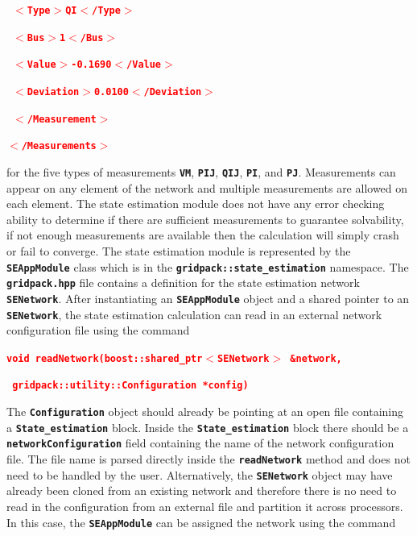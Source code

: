 \documentclass[12pt]{report} %
\begin{document}
\textcolor{red}{\texttt{\textbf{    $\boldsymbol{\mathrm{<}}$Type$\boldsymbol{\mathrm{>}}$QI$\boldsymbol{\mathrm{<}}$/Type$\boldsymbol{\mathrm{>}}$}}}

\textcolor{red}{\texttt{\textbf{    $\boldsymbol{\mathrm{<}}$Bus$\boldsymbol{\mathrm{>}}$1$\boldsymbol{\mathrm{<}}$/Bus$\boldsymbol{\mathrm{>}}$}}}

\textcolor{red}{\texttt{\textbf{    $\boldsymbol{\mathrm{<}}$Value$\boldsymbol{\mathrm{>}}$-0.1690$\boldsymbol{\mathrm{<}}$/Value$\boldsymbol{\mathrm{>}}$}}}

\textcolor{red}{\texttt{\textbf{    $\boldsymbol{\mathrm{<}}$Deviation$\boldsymbol{\mathrm{>}}$0.0100$\boldsymbol{\mathrm{<}}$/Deviation$\boldsymbol{\mathrm{>}}$}}}

\textcolor{red}{\texttt{\textbf{  $\boldsymbol{\mathrm{<}}$/Measurement$\boldsymbol{\mathrm{>}}$}}}

\textcolor{red}{\texttt{\textbf{$\boldsymbol{\mathrm{<}}$/Measurements$\boldsymbol{\mathrm{>}}$}}}

for the five types of measurements \texttt{\textbf{VM}}, \texttt{\textbf{PIJ}}, \texttt{\textbf{QIJ}}, \texttt{\textbf{PI}}, and \texttt{\textbf{PJ}}. Measurements can appear on any element of the network and multiple measurements are allowed on each element. The state estimation module does not have any error checking ability to determine if there are sufficient measurements to guarantee solvability, if not enough measurements are available then the calculation will simply crash or fail to converge.
The state estimation module is represented by the \texttt{\textbf{SEAppModule}} class which is in the \texttt{\textbf{gridpack::state\_estimation}} namespace. The \texttt{\textbf{gridpack.hpp}} file contains a definition for the state estimation network \texttt{\textbf{SENetwork}}. After instantiating an \texttt{\textbf{SEAppModule}} object and a shared pointer to an \texttt{\textbf{SENetwork}}, the state estimation calculation can read in an external network configuration file using the command

\textcolor{red}{\texttt{\textbf{void readNetwork(boost::shared\_ptr$\boldsymbol{\mathrm{<}}$SENetwork$\boldsymbol{\mathrm{>}}$ \&network,}}}

\textcolor{red}{\texttt{\textbf{    gridpack::utility::Configuration *config)}}}

The \texttt{\textbf{Configuration}} object should already be pointing at an open file containing a \texttt{\textbf{State\_estimation}} block. Inside the \texttt{\textbf{State\_estimation}} block there should be a \texttt{\textbf{networkConfiguration}} field containing the name of the network configuration file. The file name is parsed directly inside the \texttt{\textbf{readNetwork}} method and does not need to be handled by the user.
Alternatively, the \texttt{\textbf{SENetwork}} object may have already been cloned from an existing network and therefore there is no need to read in the configuration from an external file and partition it across processors. In this case, the \texttt{\textbf{SEAppModule}} can be assigned the network using the command
\end{document}
